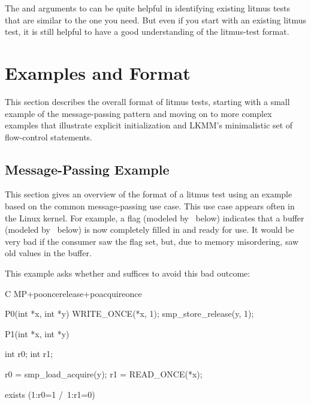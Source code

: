 The  and  arguments to  can be quite helpful
in identifying existing litmus tests that are similar to the one you need.
But even if you start with an existing litmus test, it is still helpful
to have a good understanding of the litmus-test format.


\section{Examples and Format}

This section describes the overall format of litmus tests, starting
with a small example of the message-passing pattern and moving on to
more complex examples that illustrate explicit initialization and LKMM's
minimalistic set of flow-control statements.


\subsection{Message-Passing Example}

This section gives an overview of the format of a litmus test using an
example based on the common message-passing use case.
This use case appears often in the Linux kernel.
For example, a flag (modeled by~ below) indicates that a buffer
(modeled by~ below) is now completely filled in and ready for use.
It would be very bad if the consumer saw the flag set, but, due to memory
misordering, saw old values in the buffer.

This example asks whether  and 
suffices to avoid this bad outcome:

\begin{fcvlabel}
\begin{VerbatimN}[commandchars=\%\@\$]
	C MP+pooncerelease+poacquireonce  %

	{}    %

	P0(int *x, int *y)   %
	{
		WRITE_ONCE(*x, 1);   %
		smp_store_release(y, 1);   %
	}   %

	P1(int *x, int *y)   %
	{
		int r0;   %
		int r1;   %

		r0 = smp_load_acquire(y);   %
		r1 = READ_ONCE(*x);    %
	}   %

	exists (1:r0=1 /\ 1:r1=0)  %
\end{VerbatimN}
\end{fcvlabel}

